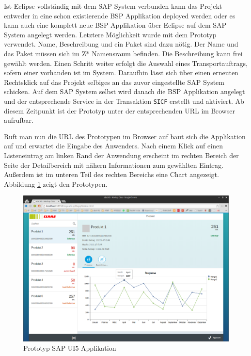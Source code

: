 Ist Eclipse vollständig mit dem SAP System verbunden kann das Projekt entweder in eine schon existierende BSP Applikation deployed werden oder es kann auch eine komplett neue BSP Applikation über Eclipse auf dem SAP System angelegt werden. Letztere Möglichkeit wurde mit dem Prototyp verwendet. Name, Beschreibung und ein Paket sind dazu nötig. Der Name und das Paket müssen sich im Z* Namensraum befinden. Die Beschreibung kann frei gewählt werden. Einen Schritt weiter erfolgt die Auswahl eines Transportauftrags, sofern einer vorhanden ist im System. Daraufhin lässt sich über einen erneuten Rechtsklick auf das Projekt selbiges an das zuvor eingestellte SAP System schicken. Auf dem SAP System selbst wird danach die BSP Applikation angelegt und der entsprechende Service in der Transaktion \texttt{SICF} erstellt und aktiviert. Ab diesem Zeitpunkt ist der Prototyp unter der entsprechenden URL im Browser aufrufbar.\par Ruft man nun die URL des Prototypen im Browser auf baut sich die Applikation auf und erwartet die Eingabe des Anwenders. Nach einem Klick auf einen Listeneintrag am linken Rand der Anwendung erscheint im rechten Bereich der Seite der Detailbereich mit nähern Informationen zum gewählten Eintrag. Außerdem ist im unteren Teil des rechten Bereichs eine Chart angezeigt. Abbildung \ref{fig:prototypsplitapp} zeigt den Prototypen.

\vspace{1em}
\begin{figure}[htb]
  \centering
  \includegraphics[width=1\linewidth]{abb/sapui5_final_splitapp}
  \caption[Prototyp SAP UI5 Applikation]{Prototyp SAP UI5 Applikation}
  \label{fig:prototypsplitapp}
\end{figure}